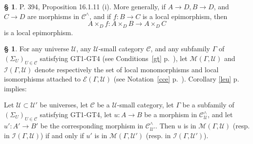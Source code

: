 \documentclass[12pt]{article}%
\theoremstyle{remark}
\theoremstyle{definition}
\newtheorem{s}[thm]{\S}%
\newcommand{\cc}{\mathcal}
\newcommand{\C}{\mathcal C}
\newcommand{\U}{\mathcal U}
\begin{document}
%

\begin{s}\label{16111}
P. 394, Proposition 16.1.11 (i). More generally, if $A\to D, B\to D$, and $C\to D$ are morphisms in $\C^\wedge$, and if $f:B\to C$ is a local epimorphism, then 
$$
A\times_Df:A\times_DB\to A\times_DC
$$ 
is a local epimorphism.
\end{s}

%

\begin{s}
For any universe $\U$, any $\U$-small category $\C$, and any subfamily $\Gamma$ of $(\Sigma_U)_{U\in\C}$ satisfying GT1-GT4 (see Conditions~\ref{gt} p.~\pageref{gt}), let $\cc M(\Gamma,\U)$ and $\cc I(\Gamma,\U)$ denote respectively the set of local monomorphisms and local isomorphisms attached to $\cc E(\Gamma,\U)$ (see Notation~\ref{cce} p.~\pageref{cce}). Corollary \ref{leu} p. \pageref{leu} implies:

Let $\U\subset\U'$ be universes, let $\C$ be a $\U$-small category, let $\Gamma$ be a subfamily of $(\Sigma_U)_{U\in\C}$ satisfying GT1-GT4, let $u:A\to B$ be a morphism in $\C^\wedge_\U$, and let $u':A'\to B'$ be the corresponding morphism in $\C^\wedge_{\U'}$. Then $u$ is in $\cc M(\Gamma,\U)$ (resp. in $\cc I(\Gamma,\U)$) if and only if $u'$ is in $\cc M(\Gamma,\U')$ (resp. in $\cc I(\Gamma,\U')$).
\end{s}

%
\end{document}
